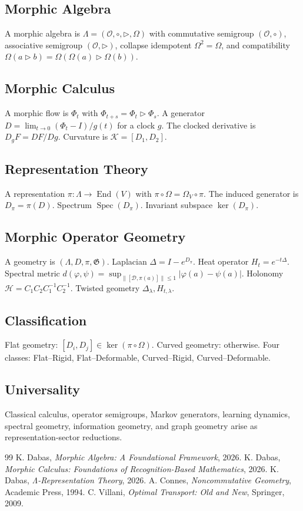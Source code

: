 \documentclass[12pt, oneside]{article}
\DeclareMathOperator{\Spec}{Spec}
\DeclareMathOperator{\End}{End}
\begin{document}
\subsection{Morphic Algebra}
A morphic algebra is $\Lambda = (\mathcal{O}, \circ, \triangleright, \Omega)$ with commutative semigroup $(\mathcal{O},\circ)$, associative semigroup $(\mathcal{O},\triangleright)$, collapse idempotent $\Omega^2=\Omega$, and compatibility $\Omega(a \triangleright b) = \Omega(\Omega(a) \triangleright \Omega(b))$.

\subsection{Morphic Calculus}
A morphic flow is $\Phi_t$ with $\Phi_{t+s} = \Phi_t \triangleright \Phi_s$. A generator $D = \lim_{t\to 0} (\Phi_t - I)/g(t)$ for a clock $g$. The clocked derivative is $D_g F = DF/Dg$. Curvature is $\mathcal{K} = [D_1, D_2]$.

\subsection{Representation Theory}
A representation $\pi: \Lambda \to \End(V)$ with $\pi \circ \Omega = \Omega_V \circ \pi$. The induced generator is $D_\pi = \pi(D)$. Spectrum $\Spec(D_\pi)$. Invariant subspace $\ker(D_\pi)$.

\subsection{Morphic Operator Geometry}
A geometry is $(\Lambda, D, \pi, \mathfrak{G})$. Laplacian $\Delta = I - e^{D_\pi}$. Heat operator $H_t = e^{-t\Delta}$. Spectral metric $d(\varphi,\psi) = \sup_{\|[\mathcal{D}, \pi(a)]\|\le 1} |\varphi(a)-\psi(a)|$. Holonomy $\mathcal{H} = C_1 C_2 C_1^{-1} C_2^{-1}$. Twisted geometry $\Delta_\lambda, H_{t,\lambda}$.

\subsection{Classification}
Flat geometry: $[D_i, D_j] \in \ker(\pi \circ \Omega)$. Curved geometry: otherwise. Four classes: Flat--Rigid, Flat--Deformable, Curved--Rigid, Curved--Deformable.

\subsection{Universality}
Classical calculus, operator semigroups, Markov generators, learning dynamics, spectral geometry, information geometry, and graph geometry arise as representation-sector reductions.

\begin{thebibliography}{99}
 K. Dabas, \emph{Morphic Algebra: A Foundational Framework}, 2026.
 K. Dabas, \emph{Morphic Calculus: Foundations of Recognition-Based Mathematics}, 2026.
 K. Dabas, \emph{Λ-Representation Theory}, 2026.
 A. Connes, \emph{Noncommutative Geometry}, Academic Press, 1994.
 C. Villani, \emph{Optimal Transport: Old and New}, Springer, 2009.
\end{thebibliography}
\end{document}
